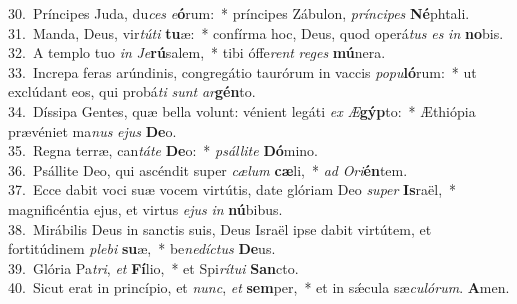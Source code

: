 {30.~}Príncipes Juda, du\textit{ces} \textit{e}\textbf{ó}rum:~* príncipes Zábulon, \textit{prín}\textit{ci}\textit{pes} \textbf{Né}phtali.\\
{31.~}Manda, Deus, vir\textit{tú}\textit{ti} \textbf{tu}æ:~* confírma hoc, Deus, quod operá\textit{tus} \textit{es} \textit{in} \textbf{no}bis.\\
{32.~}A templo tuo \textit{in} \textit{Je}\textbf{rú}salem,~* tibi óffe\textit{rent} \textit{re}\textit{ges} \textbf{mú}nera.\\
{33.~}Increpa feras arúndinis, congregátio taurórum in vaccis \textit{po}\textit{pu}\textbf{ló}rum:~* ut exclúdant eos, qui probá\textit{ti} \textit{sunt} \textit{ar}\textbf{gén}to.\\
{34.~}Díssipa Gentes, quæ bella volunt: vénient legáti \textit{ex} \textit{Æ}\textbf{gýp}to:~* Æthiópia prævéniet ma\textit{nus} \textit{e}\textit{jus} \textbf{De}o.\\
{35.~}Regna terræ, can\textit{tá}\textit{te} \textbf{De}o:~* \textit{psál}\textit{li}\textit{te} \textbf{Dó}mino.\\
{36.~}Psállite Deo, qui ascéndit super \textit{cæ}\textit{lum} \textbf{cæ}li,~* \textit{ad} \textit{O}\textit{ri}\textbf{én}tem.\\
{37.~}Ecce dabit voci suæ vocem virtútis, date glóriam Deo \textit{su}\textit{per} \textbf{Is}raël,~* magnificéntia ejus, et virtus \textit{e}\textit{jus} \textit{in} \textbf{nú}bibus.\\
{38.~}Mirábilis Deus in sanctis suis, Deus Israël ipse dabit virtútem, et fortitúdinem \textit{ple}\textit{bi} \textbf{su}æ,~* be\textit{ne}\textit{dí}\textit{ctus} \textbf{De}us.\\
{39.~}Glória Pa\textit{tri}, \textit{et} \textbf{Fí}lio,~* et Spi\textit{rí}\textit{tu}\textit{i} \textbf{San}cto.\\
{40.~}Sicut erat in princípio, et \textit{nunc}, \textit{et} \textbf{sem}per,~* et in sǽcula sæ\textit{cu}\textit{ló}\textit{rum}. \textbf{A}men.\\
